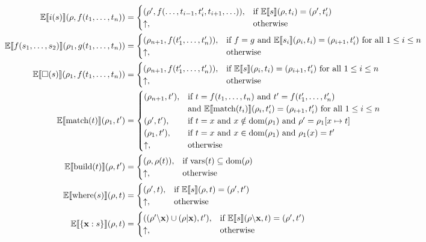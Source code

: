 \documentclass{article}
\begin{document}
{\begin{align*}
  \mathbb{E} \llbracket i(s) \rrbracket (\rho,f(t_1,\ldots,t_n)) &= 
    \begin{cases}
      (\rho',f(\ldots,t_{i-1}, t_i', t_{i+1}, \ldots)), & \text{if } \mathbb{E} \llbracket s \rrbracket (\rho,t_{i}) = (\rho',t_{i}') \\
      \uparrow, & \text{otherwise}
    \end{cases} \\
  \mathbb{E} \llbracket f(s_1,\ldots,s_2) \rrbracket (\rho_1,g(t_1,\ldots,t_n)) &= 
    \begin{cases}
      (\rho_{n+1},f(t_1',\ldots,t_n')), & \text{if } f = g \text{ and } \mathbb{E} \llbracket s_i \rrbracket (\rho_{i},t_{i}) = (\rho_{i+1},t_{i}') \text { for all } 1 \leq i \leq n \\
      \uparrow, & \text{otherwise}
    \end{cases} \\
  \mathbb{E} \llbracket \square(s) \rrbracket (\rho_1,f(t_1,\ldots,t_n)) &= 
    \begin{cases}
      (\rho_{n+1},f(t_1',\ldots,t_n')), & \text{if } \mathbb{E} \llbracket s \rrbracket (\rho_{i},t_{i}) = (\rho_{i+1},t_{i}') \text { for all } 1 \leq i \leq n \\
      \uparrow, & \text{otherwise}
    \end{cases} \\
  \mathbb{E} \llbracket \text{match}(t) \rrbracket (\rho_1,t') &= 
    \begin{cases}
      (\rho_{n+1},t'), & \text{if } t = f(t_1,\ldots,t_n) \text{ and } t' = f(t_1',\ldots,t_n') \\
                      & \text{and } \mathbb{E} \llbracket \text{match}(t_i) \rrbracket (\rho_{i},t_{i}') = (\rho_{i+1},t_{i}') \text { for all } 1 \leq i \leq n \\
      (\rho',t'), & \text{if } t = x \text{ and } x \notin \text{dom}(\rho_1) \text{ and } \rho' = \rho_1[x \mapsto t]  \\
      (\rho_1,t'), & \text{if } t = x \text{ and } x \in \text{dom}(\rho_1) \text{ and } \rho_1(x) = t' \\
      \uparrow, & \text{otherwise}
    \end{cases} \\
  \mathbb{E} \llbracket \text{build}(t) \rrbracket (\rho,t') &= 
    \begin{cases}
      (\rho,\rho(t)), & \text{if } \text{vars}(t) \subseteq \text{dom}(\rho) \\
      \uparrow, & \text{otherwise}
    \end{cases} \\
  \mathbb{E} \llbracket \text{where}(s) \rrbracket (\rho,t) &=
    \begin{cases}
      (\rho',t),& \text{if } \mathbb{E} \llbracket s \rrbracket (\rho,t) = (\rho',t') \\
      \uparrow,& \text{otherwise} \\
    \end{cases} \\
  \mathbb{E} \llbracket \lbrace \mathbf{x} : s \rbrace \rrbracket (\rho,t) &=
    \begin{cases}
      ((\rho' \backslash \mathbf{x}) \cup (\rho | \mathbf{x}),t'),& \text{if } \mathbb{E} \llbracket s \rrbracket (\rho \backslash \mathbf{x},t) = (\rho',t') \\
      \uparrow,& \text{otherwise} \\
    \end{cases} \\
\end{align*}

}
\end{document}

